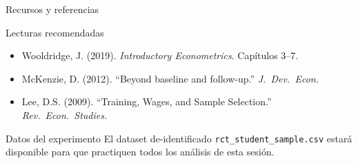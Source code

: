 \documentclass[aspectratio=169, 11pt]{beamer}
\begin{document}
\begin{frame}{Recursos y referencias}
\begin{exampleblock}{Lecturas recomendadas}
\begin{itemize}\setlength{\itemsep}{4pt}
  \item Wooldridge, J. (2019). \textit{Introductory Econometrics}. Capítulos 3--7.
  \item McKenzie, D. (2012). ``Beyond baseline and follow-up.'' \textit{J.\ Dev.\ Econ.}
  \item Lee, D.S. (2009). ``Training, Wages, and Sample Selection.'' \textit{Rev.\ Econ.\ Studies.}
\end{itemize}
\end{exampleblock}

\vspace{0.3cm}
\begin{block}{Datos del experimento}
El dataset de-identificado \texttt{rct\_student\_sample.csv} estará disponible para que practiquen todos los análisis de esta sesión.
\end{block}
\end{frame}
\end{document}
